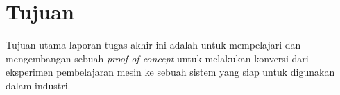 \section{Tujuan}

Tujuan utama laporan tugas akhir ini adalah untuk mempelajari dan mengembangan sebuah \textit{proof of concept} untuk melakukan konversi dari eksperimen pembelajaran mesin ke sebuah sistem yang siap untuk digunakan dalam industri.